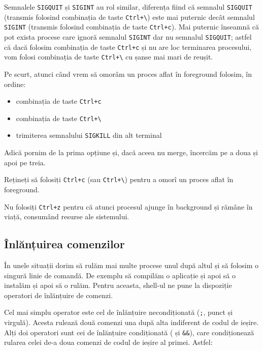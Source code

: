 Semnalele \texttt{SIGQUIT} și \texttt{SIGINT} au rol similar, diferența fiind că semnalul \texttt{SIGQUIT}
(transmis folosind combinația de taste \texttt{Ctrl+\textbackslash{}}) este mai puternic
decât semnalul \texttt{SIGINT} (transmis folosind combinația de taste \texttt{Ctrl+c}). Mai
puternic înseamnă că pot exista procese care ignoră semnalul \texttt{SIGINT} dar nu
semnalul \texttt{SIGQUIT}; astfel că dacă folosim combinația de taste \texttt{Ctrl+c} și nu are
loc terminarea procesului, vom folosi combinația de taste \texttt{Ctrl+\textbackslash{}}
cu șanse mai mari de reușit.

Pe scurt, atunci când vrem să omorâm un proces aflat în foreground folosim, în
ordine:

\begin{itemize}
  \item combinația de taste \texttt{Ctrl+c}
  \item combinația de taste \texttt{Ctrl+\textbackslash{}}
  \item trimiterea semnalului \texttt{SIGKILL} din alt terminal
\end{itemize}

Adică pornim de la prima opțiune și, dacă aceea nu merge, încercăm pe a doua și
apoi pe treia.

\begin{note}
Rețineți să folosiți \texttt{Ctrl+c} (sau \texttt{Ctrl+\textbackslash{}}) pentru a omorî un proces aflat în foreground.

Nu folosiți \texttt{Ctrl+z} pentru că atunci procesul ajunge în background și rămâne în
viață, consumând resurse ale sistemului.
\end{note}

\subsection{Înlănțuirea comenzilor}
\label{sec:process-operatii-inlantuire}

În unele situații dorim să rulăm mai multe procese unul după altul și să folosim
o singură linie de comandă. De exemplu să compilăm o aplicație și apoi să o
instalăm și apoi să o rulăm. Pentru aceasta, shell-ul ne pune la dispoziție
operatori de înlănțuire de comenzi.

Cel mai simplu operator este cel de înlănțuire necondiționată (\texttt{;}, punct și virgulă). Acesta
rulează două comenzi una după alta indiferent de codul de ieșire. Alți doi
operatori sunt cei de înlănțuire condiționată (\texttt{\textbar{}\textbar{}} și \texttt{\&\&}), care condiționează rularea celei
de-a doua comenzi de codul de ieșire al primei. Astfel:

